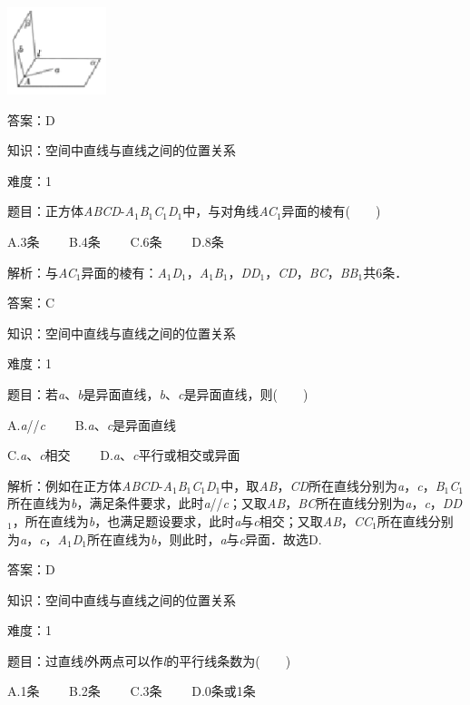 \documentclass{article} %
\begin{document}
\includegraphics*[width=1.14in, height=1.00in, keepaspectratio=false]{image101}

答案：D

知识：空间中直线与直线之间的位置关系

难度：1

题目：正方体\textit{ABCD}-\textit{A}${}_{1}$\textit{B}${}_{1}$\textit{C}${}_{1}$\textit{D}${}_{1}$中，与对角线\textit{AC}${}_{1}$异面的棱有(　　)

A.3条　　 B.4条　　 C.6条　　 D.8条

解析：与\textit{AC}${}_{1}$异面的棱有：\textit{A}${}_{1}$\textit{D}${}_{1}$，\textit{A}${}_{1}$\textit{B}${}_{1}$，\textit{DD}${}_{1}$，\textit{CD}，\textit{BC}，\textit{BB}${}_{1}$共6条．

答案：C

知识：空间中直线与直线之间的位置关系

难度：1

题目：若\textit{a}、\textit{b}是异面直线，\textit{b}、\textit{c}是异面直线，则(　　)

A.\textit{a}//\textit{c}　　  B.\textit{a}、\textit{c}是异面直线

C.\textit{a}、\textit{c}相交　　  D.\textit{a}、\textit{c}平行或相交或异面

解析：例如在正方体\textit{ABCD}-\textit{A}${}_{1}$\textit{B}${}_{1}$\textit{C}${}_{1}$\textit{D}${}_{1}$中，取\textit{AB}，\textit{CD}所在直线分别为\textit{a}，\textit{c}，\textit{B}${}_{1}$\textit{C}${}_{1}$所在直线为\textit{b}，满足条件要求，此时\textit{a}//\textit{c}；又取\textit{AB}，\textit{BC}所在直线分别为\textit{a}，\textit{c}，\textit{DD}${}_{1}$，所在直线为\textit{b}，也满足题设要求，此时\textit{a}与\textit{c}相交；又取\textit{AB}，\textit{CC}${}_{1}$所在直线分别为\textit{a}，\textit{c}，\textit{A}${}_{1}$\textit{D}${}_{1}$所在直线为\textit{b}，则此时，\textit{a}与\textit{c}异面．故选D.

答案：D

知识：空间中直线与直线之间的位置关系

难度：1

题目：过直线\textit{l}外两点可以作\textit{l}的平行线条数为(　　)

A.1条　　 B.2条　　 C.3条　　 D.0条或1条
\end{document}
